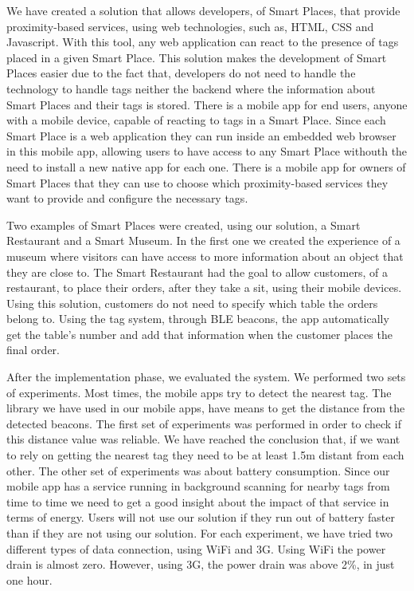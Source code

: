 We have created a solution that allows developers, of Smart Places, that provide proximity-based services, using web technologies, such as, \gls{HTML}, \gls{CSS} and Javascript.
With this tool, any web application can react to the presence of tags placed in a given Smart Place.
This solution makes the development of Smart Places easier due to the fact that, developers do not need to handle the technology to handle tags neither the backend where the information about Smart Places and their tags is stored.
There is a mobile app for end users, anyone with a mobile device, capable of reacting to tags in a Smart Place.
Since each Smart Place is a web application they can run inside an embedded web browser in this mobile app, allowing users to have access to any Smart Place withouth the need to install a new native app for each one.
There is a mobile app for owners of Smart Places that they can use to choose which proximity-based services they want to provide and configure the necessary tags.

Two examples of Smart Places were created, using our solution, a Smart Restaurant and a Smart Museum.
In the first one we created the experience of a museum where visitors can have access to more information about an object that they are close to.
The Smart Restaurant had the goal to allow customers, of a restaurant, to place their orders, after they take a sit, using their mobile devices.
Using this solution, customers do not need to specify which table the orders belong to. Using the tag system, through \gls{BLE} beacons, the app automatically get the table's number and add that information when the customer places the final order.

After the implementation phase, we evaluated the system.
We performed two sets of experiments.
Most times, the mobile apps try to detect the nearest tag.
The library we have used in our mobile apps, have means to get the distance from the detected beacons.
The first set of experiments was performed in order to check if this distance value was reliable.
We have reached the conclusion that, if we want to rely on getting the nearest tag they need to be at least 1.5m distant from each other.
The other set of experiments was about battery consumption.
Since our mobile app has a service running in background scanning for nearby tags from time to time we need to get a good insight about the impact of that service in terms of energy.
Users will not use our solution if they run out of battery faster than if they are not using our solution.
For each experiment, we have tried two different types of data connection, using \gls{WiFi} and \gls{3G}.
Using \gls{WiFi} the power drain is almost zero.
However, using \gls{3G}, the power drain was above 2\%, in just one hour.


